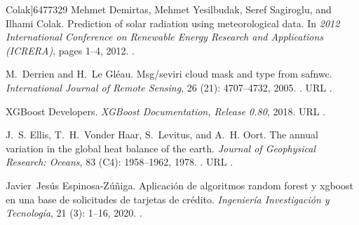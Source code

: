 \documentclass[letterpaper,12pt, twoside]{report}
\providecommand{\DIFdeltex}[1]{{\protect\color{red} \scriptsize #1}} %
\providecommand{\DIFdel}[1]{\texorpdfstring{\DIFdeltex{#1}}{}} %
\begin{document}
  Colak]{6477329}
\DIFdel{Mehmet Demirtas, Mehmet Yesilbudak, Seref Sagiroglu, and Ilhami Colak.
}%
\DIFdel{Prediction of solar radiation using meteorological data.
}%
\DIFdel{In \emph{2012 International Conference on Renewable Energy Research
  and Applications (ICRERA)}, pages 1--4, 2012.
}%
\DIFdel{.
}%

\DIFdel{M.~Derrien and H.~Le Gléau.
}%
\DIFdel{Msg/seviri cloud mask and type from safnwc.
}%
\DIFdel{\emph{International Journal of Remote Sensing}, 26}%
\DIFdel{(21):}%
\DIFdel{4707--4732, 2005.
}%
\DIFdel{.
}%
\DIFdel{URL }%
\DIFdel{.
}%

\DIFdel{XGBoost Developers.
}%
\DIFdel{\emph{XGBoost Documentation, Release 0.80}, 2018.
}%
\DIFdel{URL }%
\DIFdel{.
}%

\DIFdel{J.~S. Ellis, T.~H.~Vonder Haar, S.~Levitus, and A.~H. Oort.
}%
\DIFdel{The annual variation in the global heat balance of the earth.
}%
\DIFdel{\emph{Journal of Geophysical Research: Oceans}, 83}%
\DIFdel{(C4):}%
\DIFdel{1958--1962, 1978.
}%
\DIFdel{.
}%
\DIFdel{URL
  }%
\DIFdel{.
}%

\DIFdel{Javier~Jesús Espinosa-Zúñiga.
}%
\DIFdel{Aplicación de algoritmos random forest y xgboost en una base de
  solicitudes de tarjetas de crédito.
}%
\DIFdel{\emph{Ingeniería Investigación y Tecnología}, 21}%
\DIFdel{(3):}%
\DIFdel{1--16, 2020.
}%
\DIFdel{.
}%
\end{document}
